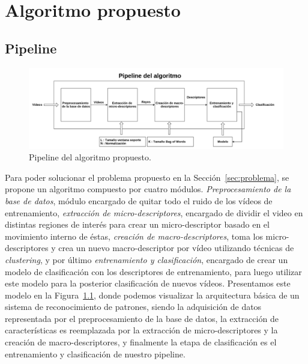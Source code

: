 \chapter[Algoritmo propuesto]{Algoritmo propuesto}
\label{ch:algoritmo}
\section{Pipeline}
\label{sec:pipeline}



\begin{figure}[bt]
	\centering
	\includegraphics[width=1\textwidth]{Figuras/Diagramas/pipeline.png}
	\caption{Pipeline del algoritmo propuesto.}
	\label{algoritmo:fig:pipeline}
\end{figure}

Para poder solucionar el problema propuesto en la Sección~\ref{sec:problema}, se propone un algoritmo compuesto por cuatro módulos. \emph{Preprocesamiento de la base de datos}, módulo encargado de quitar todo el ruido de los vídeos de entrenamiento, \emph{extracción de micro-descriptores}, encargado de dividir el video en distintas regiones de interés para crear un micro-descriptor basado en el movimiento interno de éstas, \emph{creación de macro-descriptores}, toma los micro-descriptores y crea un nuevo macro-descriptor por vídeo utilizando técnicas de \textit{clustering}, y por último \emph{entrenamiento y clasificación}, encargado de crear un modelo de clasificación con los descriptores de entrenamiento, para luego utilizar este modelo para la posterior clasificación de nuevos vídeos. Presentamos este modelo en la Figura~\ref{algoritmo:fig:pipeline}, donde podemos visualizar la arquitectura básica de un sistema de reconocimiento de patrones, siendo la adquisición de datos representada por el preprocesamiento de la base de datos, la extracción de características es reemplazada por la extracción de micro-descriptores y la creación de macro-descriptores, y finalmente la etapa de clasificación es el entrenamiento y clasificación de nuestro pipeline.
	


